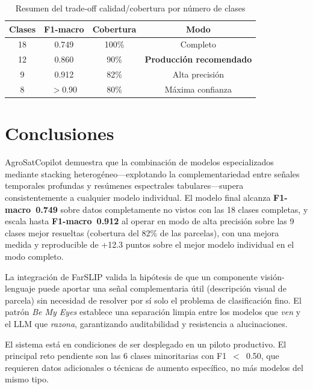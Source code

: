 \documentclass{article}
\begin{document}
\begin{table}[htbp]
\caption{Resumen del trade-off calidad/cobertura por número de clases}
\label{tab:cardinality}
\centering
\begin{tabular}{cccc}
\toprule
\textbf{Clases} & \textbf{F1-macro} & \textbf{Cobertura} & \textbf{Modo} \\
\midrule
18 & 0.749 & 100\% & Completo \\
12 & 0.860 & 90\%  & \textbf{Producción recomendado} \\
9  & 0.912 & 82\%  & Alta precisión \\
8  & $>$0.90 & 80\% & Máxima confianza \\
\bottomrule
\end{tabular}
\end{table}

\section{Conclusiones}

AgroSatCopilot demuestra que la combinación de modelos especializados
mediante stacking heterogéneo---explotando la complementariedad entre
señales temporales profundas y resúmenes espectrales tabulares---supera
consistentemente a cualquier modelo individual. El modelo final alcanza
\textbf{F1-macro~0.749} sobre datos completamente no vistos con las 18
clases completas, y escala hasta \textbf{F1-macro~0.912} al operar en
modo de alta precisión sobre las 9 clases mejor resueltas (cobertura del
82\% de las parcelas), con una mejora medida y reproducible de +12.3
puntos sobre el mejor modelo individual en el modo completo.

La integración de FarSLIP valida la hipótesis de que un componente
visión-lenguaje puede aportar una señal complementaria útil (descripción
visual de parcela) sin necesidad de resolver por sí solo el problema de
clasificación fino. El patrón \textit{Be My Eyes} establece una separación
limpia entre los modelos que \textit{ven} y el LLM que \textit{razona},
garantizando auditabilidad y resistencia a alucinaciones.

El sistema está en condiciones de ser desplegado en un piloto productivo.
El principal reto pendiente son las 6 clases minoritarias con
F1~$<$~0.50, que requieren datos adicionales o técnicas de aumento
específico, no más modelos del mismo tipo.
\end{document}
